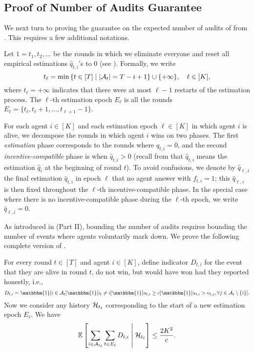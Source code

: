 \subsection{Proof of Number of Audits Guarantee}\label{subsec:proof_audits}

We next turn to proving the guarantee on the expected number of audits of \mechname from . This requires a few additional notations.

\begin{definition}
Let $1=t_1,t_2,\ldots$ be the rounds in which we eliminate everyone and reset all empirical estimations $\hat q_{t,i}$'s to $0$ (see ). Formally, we write
\begin{equation*}
    t_\ell=\min \left\{ t\in[T]\mid \lvert \mathcal{A}_t\rvert =T-i+1 \right\}\cup\{+\infty\}, \quad \ell\in[K],
\end{equation*}
where $t_\ell=+\infty$ indicates that there were at most $\ell-1$ restarts of the estimation process. The $\ell$-th estimation epoch $E_\ell$ is all the rounds $E_\ell=\{t_\ell,t_\ell+1,\ldots,t_{\ell+1}-1\}$.
\end{definition}

For each agent $i\in[K]$ and each estimation epoch $\ell\in[K]$ in which agent $i$ is alive, we decompose the rounds in which agent $i$ wins on two phases. The first \emph{estimation} phase corresponds to the rounds where $\hat q_{t,i}=0$, and the second \emph{incentive-compatible} phase is when $\hat q_{t,i}>0$ (recall from  that $\hat q_{t,i}$ means the estimation $\hat q_i$ at the beginning of round $t$). To avoid confusions, we denote by $\hat q_{\ell,i}$ the final estimation $\hat q_{t,i}$ in epoch $\ell$ that no agent answer with $f_{t,i}=1$; this $\hat q_{\ell,i}$ is then fixed throughout the $\ell$-th incentive-compatible phase. In the special case where there is no incentive-compatible phase during the $\ell$-th epoch, we write $\hat q_{\ell,i}=0$.

As introduced in  (Part II), bounding the number of audits requires bounding the number of events where agents voluntarily mark down. We prove the following complete version of .

\begin{lemma}\label{lem:number of marking down bound formal}
For every round $t\in [T]$ and agent $i\in [K]$, define indicator $D_{t,i}$ for the event that they are alive in round $t$, do not win, but would have won had they reported honestly, i.e.,
\begin{equation*}
D_{t,i}=\mathbbm{1}[i\in \mA_t]\mathbbm{1}[i_t\ne i]\mathbbm{1}[u_{t,i}\geq c]\mathbbm{1}[u_{t,i}>v_{t,j},\forall j\in \mA_t\setminus\{i\}].
\end{equation*}
Now we consider any history $\mathcal{H}_{t_\ell}$ corresponding to the start of a new estimation epoch $E_\ell$. We have
\begin{equation*}
    \E\sqb{\sum_{i\in\mA_{t_\ell}}\sum_{t\in E_\ell} D_{t,i}\middle \vert\mH_{t_\ell}} \leq \frac{2K^2}{c}.
\end{equation*}
\end{lemma}


